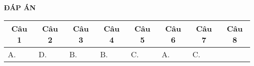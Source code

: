 \textbf{ĐÁP ÁN}
\begin{longtable}[\textwidth]{|p{}|p{}|p{}|p{}|p{}|p{}|p{}|p{}|}
	\hline%
	\multicolumn{1}{|c|}{\textbf{Câu 1}} & \multicolumn{1}{c|}{\textbf{Câu 2}} & \multicolumn{1}{c|}{\textbf{Câu 3}} &
	\multicolumn{1}{c|}{\textbf{Câu 4}} &
	\multicolumn{1}{c|}{\textbf{Câu 5}} &
	\multicolumn{1}{c|}{\textbf{Câu 6}} &
	\multicolumn{1}{c|}{\textbf{Câu 7}} &
	\multicolumn{1}{c|}{\textbf{Câu 8}} \\
	\hline
	A.&D. &B. &B. &C. &A. &C. &	\\
	\hline
	
\end{longtable}



